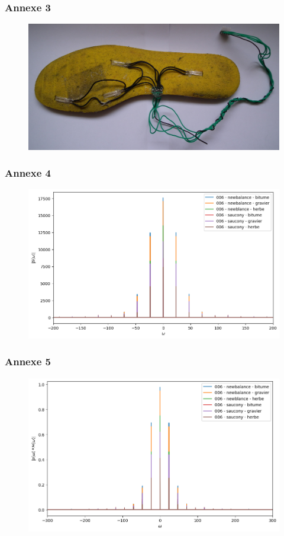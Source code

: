 \begin{frame}
    \frametitle{Annexe 3}
    \begin{figure}
        \includegraphics[scale=0.1]{./figures/sem_03.jpg}
    \end{figure}
\end{frame}
\begin{frame}
    \frametitle{Annexe 4}
    \begin{figure}
        \includegraphics[scale=0.4]{./figures/rheo_03.png}
    \end{figure}
\end{frame}
\begin{frame}
    \frametitle{Annexe 5}
    \begin{figure}
        \includegraphics[scale=0.4]{./figures/rheo_04.png}
    \end{figure}
\end{frame}
